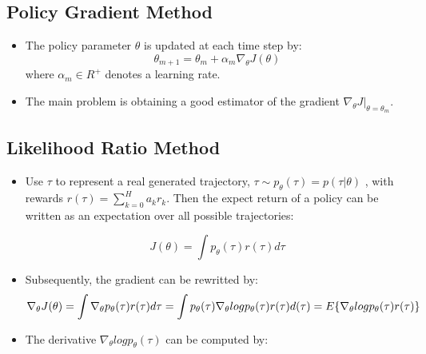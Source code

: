 {\begin{pcolumn}
\subsection{Policy Gradient Method}
\vspace*{-17mm}
%
{\large
\begin{itemize}
	\item The policy parameter $\theta$ is updated at each time step by:
\begin{equation}
	\theta_{m+1} = \theta_m + \alpha_m \nabla_\theta J(\theta)
\end{equation}
where $\alpha_m \in R^+$ denotes a learning rate.
	\item The main problem is obtaining a good estimator of the gradient $\nabla_\theta J |_{\theta=\theta_m}$.
\end{itemize}
}

\subsection{Likelihood Ratio Method}
\vspace*{-17mm}
{\large
%
\begin{itemize}
	\item Use $\tau$ to represent a real generated trajectory, $\tau \sim p_\theta(\tau) = p(\tau | \theta)$ , with rewards $r(\tau) = \sum_{k=0}^H a_k r_k$. Then the expect return of a policy can be written as an expectation over all possible trajectories:

\begin{equation}
	J(\theta) = \int p_\theta(\tau) r(\tau) d\tau
\end{equation}

 	\item Subsequently, the gradient can be rewritted by:
\begin{equation}
	\nabla_\theta J(\theta) = \int \nabla_\theta p_\theta(\tau) r(\tau) d\tau \nonumber \\
	= \int p_\theta(\tau) \nabla_\theta log p_\theta (\tau) r(\tau) d(\tau) \nonumber \\
	= E \{ \nabla_\theta log p_\theta (\tau) r (\tau)\}
\end{equation}

	\item The derivative $\nabla_\theta log p_\theta (\tau)$ can be computed by:


\end{itemize}}
\end{pcolumn}}
